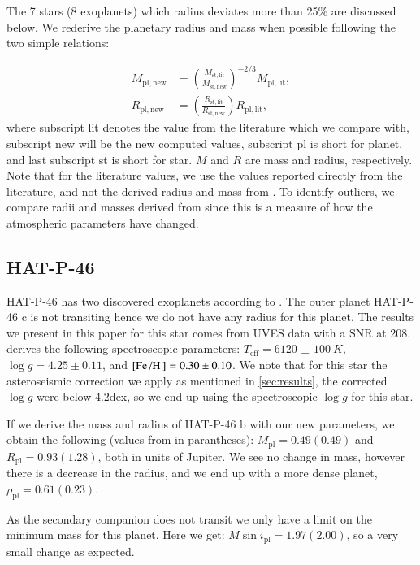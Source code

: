 \documentclass{aa}
\begin{document}
The 7 stars (8 exoplanets) which radius deviates more than 25\% are discussed
below. We rederive the planetary radius and mass when possible following the two
simple relations:

\begin{align}
    M_\mathrm{pl,new} &= \left(\frac{M_\mathrm{st,lit}}{M_\mathrm{st,new}}\right)^{-2/3} M_\mathrm{pl,lit},  \\
    R_\mathrm{pl,new} &= \left(\frac{R_\mathrm{st,lit}}{R_\mathrm{st,new}}\right) R_\mathrm{pl,lit},
\end{align}
where subscript lit denotes the value from the literature which we compare with,
subscript new will be the new computed values, subscript pl is short for planet,
and last subscript st is short for star. $M$ and $R$ are mass and radius,
respectively. Note that for the literature values, we use the values reported
directly from the literature, and not the derived radius and mass from
\citet{Torres2010}. To identify outliers, we compare radii and masses derived
from \citet{Torres2010} since this is a measure of how the atmospheric
parameters have changed.

\subsection{HAT-P-46}
\label{sub:HAT-P-46}
HAT-P-46 has two discovered exoplanets according to \citet{Hartmann2014}. The
outer planet HAT-P-46 c is not transiting hence we do not have any radius for
this planet. The results we present in this paper for this star comes from UVES
data with a SNR at 208. \citet{Hartmann2014} derives the following spectroscopic
parameters: $T_\mathrm{eff}=\SI{6120(100)}{K}$, $\log g=4.25\pm0.11$, and
$[\ion{Fe}/\ion{H}]=0.30\pm0.10$. We note that for this star the asteroseismic
correction we apply as mentioned in \ref{sec:results}, the corrected $\log g$
were below 4.2dex, so we end up using the spectroscopic $\log g$ for this star.

If we derive the mass and radius of HAT-P-46 b with our new parameters, we
obtain the following (values from \citet{Hartmann2014} in parantheses):
$M_\mathrm{pl} = 0.49(0.49)$ and $R_\mathrm{pl} = 0.93(1.28)$, both in units
of Jupiter. We see no change in mass, however there is a decrease in the radius,
and we end up with a more dense planet, $\rho_\mathrm{pl} = 0.61(0.23)$.

As the secondary companion does not transit we only have a limit on the minimum
mass for this planet. Here we get: $M\sin i_\mathrm{pl} = 1.97(2.00)$, so a very
small change as expected.
\end{document}

